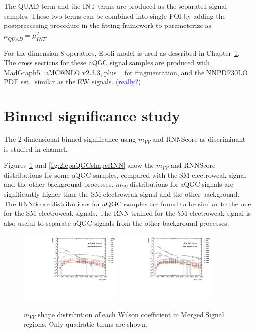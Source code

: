 The QUAD term and the INT terms are produced as the separated signal samples. These two terms can be combined into single POI by adding the postprocessing procedure in the fitting framework to parameterize as $\mu_{QUAD} = \mu_{INT}^2$.

For the dimension-8 operators, Eboli model is used as described in Chapter~\ref{}.
The cross sections for these aQGC signal samples are produced with MadGraph5\_aMC@NLO v2.3.3, plus ~\cite{Sjostrand:2007gs} for fragmentation, and the \textsc{NNPDF30LO} PDF set~\cite{Ball:2012cx} similar as the EW signals. (\textcolor{blue}{really?})


\section{Binned significance study}

The 2-dimensional binned significance using $m_{VV}$ and RNNScore as discriminant is studied in \tlep channel.

Figures~\ref{fig:2lepaQGCshapeMVV} and \ref{fig:2lepaQGCshapeRNN} show the $m_{VV}$ and RNNScore distributions for some aQGC samples, compared with the SM electroweak signal and the other background processes.
$m_{VV}$ distributions for aQGC signals are significantly higher than the SM electroweak signal and the other background.
The RNNScore distributions for aQGC samples are found to be similar to the one for the SM electroweak signals.
The RNN trained for the SM electroweak signal is also useful to separate aQGC signals from the other background processes.

\begin{figure}[ht]
    \centering
    \includegraphics[width=0.45\textwidth]{figures/aQGC/MllJ_SR_HP_aQGC.pdf}
    \includegraphics[width=0.45\textwidth]{figures/aQGC/MllJ_SR_LP_aQGC.pdf}
    \caption{$m_{VV}$ shape distribution of each Wilson coefficient in Merged Signal regions. Only quadratic terms are shown.}
    \label{fig:2lepaQGCshapeMVV}
\end{figure}

